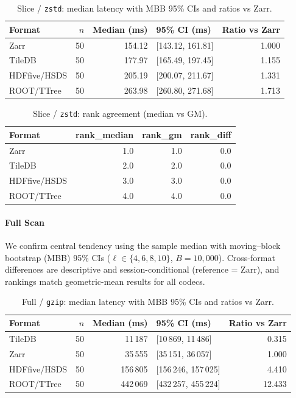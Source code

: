 \documentclass[nomenclature, english, bibtex]{kththesis}
\numberwithin{listing}{chapter}
\begin{document}
\begin{table}[H]
  \centering
  \caption{Slice / \texttt{zstd}: median latency with \gls{MBB} 95\% CIs and ratios vs Zarr.}
  \label{tab:np_slice_zstd_median}
  \begin{tabular}{l r r l r}
    \toprule
    Format & $n$ & Median (ms) & 95\% \gls{CI} (ms) & Ratio vs Zarr \\
    \midrule
    Zarr   & 50 & 154.12 & [143.12, 161.81] & 1.000 \\
    TileDB & 50 & 177.97 & [165.49, 197.45] & 1.155 \\
    \gls{HDFfive}/\gls{HSDS}   & 50 & 205.19 & [200.07, 211.67] & 1.331 \\
    \gls{ROOT}/\gls{TTree}   & 50 & 263.98 & [260.80, 271.68] & 1.713 \\
    \bottomrule
  \end{tabular}
\end{table}

\begin{table}[H]
  \centering
  \caption{Slice / \texttt{zstd}: rank agreement (median vs \gls{GM}).}
  \label{tab:np_slice_zstd_rank}
  \begin{tabular}{l r r r}
    \toprule
    Format & rank\_median & rank\_gm & rank\_diff \\
    \midrule
    Zarr   & 1.0 & 1.0 & 0.0 \\
    TileDB & 2.0 & 2.0 & 0.0 \\
    \gls{HDFfive}/\gls{HSDS}   & 3.0 & 3.0 & 0.0 \\
    \gls{ROOT}/\gls{TTree}   & 4.0 & 4.0 & 0.0 \\
    \bottomrule
  \end{tabular}
\end{table}

\paragraph{Full Scan}
We confirm central tendency using the sample median with moving–block bootstrap (\gls{MBB}) 95\% \glspl{CI} (\(\ell\in\{4,6,8,10\}\), \(B{=}10{,}000\)). Cross-format differences are descriptive and session-conditional (reference = Zarr), and rankings match geometric-mean results for all codecs.


\begin{table}[H]
  \centering
  \caption{Full / \texttt{gzip}: median latency with \gls{MBB} 95\% CIs and ratios vs Zarr.}
  \label{tab:np_full_gzip_median}
  \begin{tabular}{l r r l r}
    \toprule
    Format & $n$ & Median (ms) & 95\% \gls{CI} (ms) & Ratio vs Zarr \\
    \midrule
    TileDB & 50 & 11\,187 & [10\,869, 11\,486] & 0.315 \\
    Zarr   & 50 & 35\,555 & [35\,151, 36\,057] & 1.000 \\
    \gls{HDFfive}/\gls{HSDS}   & 50 & 156\,805 & [156\,246, 157\,025] & 4.410 \\
    \gls{ROOT}/\gls{TTree}   & 50 & 442\,069 & [432\,257, 455\,224] & 12.433 \\
    \bottomrule
  \end{tabular}
\end{table}
\end{document}
